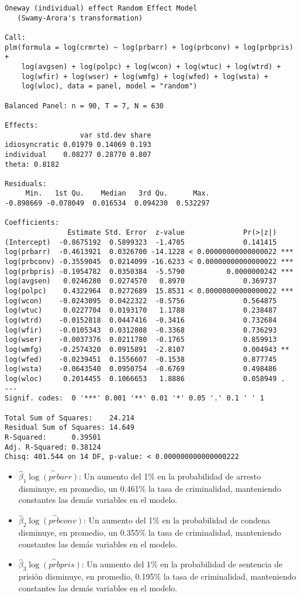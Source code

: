 \documentclass[
  12pt,
]{article}
\begin{document}
\begin{verbatim}
Oneway (individual) effect Random Effect Model 
   (Swamy-Arora's transformation)

Call:
plm(formula = log(crmrte) ~ log(prbarr) + log(prbconv) + log(prbpris) + 
    log(avgsen) + log(polpc) + log(wcon) + log(wtuc) + log(wtrd) + 
    log(wfir) + log(wser) + log(wmfg) + log(wfed) + log(wsta) + 
    log(wloc), data = panel, model = "random")

Balanced Panel: n = 90, T = 7, N = 630

Effects:
                  var std.dev share
idiosyncratic 0.01979 0.14069 0.193
individual    0.08277 0.28770 0.807
theta: 0.8182

Residuals:
     Min.   1st Qu.    Median   3rd Qu.      Max. 
-0.898669 -0.078049  0.016534  0.094230  0.532297 

Coefficients:
               Estimate Std. Error  z-value              Pr(>|z|)    
(Intercept)  -0.8675192  0.5899323  -1.4705              0.141415    
log(prbarr)  -0.4613921  0.0326700 -14.1228 < 0.00000000000000022 ***
log(prbconv) -0.3559045  0.0214099 -16.6233 < 0.00000000000000022 ***
log(prbpris) -0.1954782  0.0350384  -5.5790          0.0000000242 ***
log(avgsen)   0.0246280  0.0274570   0.8970              0.369737    
log(polpc)    0.4322964  0.0272689  15.8531 < 0.00000000000000022 ***
log(wcon)    -0.0243095  0.0422322  -0.5756              0.564875    
log(wtuc)     0.0227704  0.0193170   1.1788              0.238487    
log(wtrd)    -0.0152818  0.0447416  -0.3416              0.732684    
log(wfir)    -0.0105343  0.0312808  -0.3368              0.736293    
log(wser)    -0.0037376  0.0211780  -0.1765              0.859913    
log(wmfg)    -0.2574320  0.0915891  -2.8107              0.004943 ** 
log(wfed)    -0.0239451  0.1556607  -0.1538              0.877745    
log(wsta)    -0.0643540  0.0950754  -0.6769              0.498486    
log(wloc)     0.2014455  0.1066653   1.8886              0.058949 .  
---
Signif. codes:  0 '***' 0.001 '**' 0.01 '*' 0.05 '.' 0.1 ' ' 1

Total Sum of Squares:    24.214
Residual Sum of Squares: 14.649
R-Squared:      0.39501
Adj. R-Squared: 0.38124
Chisq: 401.544 on 14 DF, p-value: < 0.000000000000000222
\end{verbatim}

\begin{itemize}
\item
  \(\hat{\beta}_1\overset{\sim}{\log(prbarr)}\): Un aumento del 1\% en
  la probabilidad de arresto disminuye, en promedio, un 0.461\% la tasa
  de criminalidad, manteniendo constantes las demás variables en el
  modelo.
\item
  \(\hat{\beta}_2\overset{\sim}{\log(prbconv)}\): Un aumento del 1\% en
  la probabilidad de condena disminuye, en promedio, un 0.355\% la tasa
  de criminalidad, manteniendo constantes las demás variables en el
  modelo.
\item
  \(\hat{\beta}_3\overset{\sim}{\log(prbpris)}\): Un aumento del 1\% en
  la probabilidad de sentencia de prisión disminuye, en promedio,
  0.195\% la tasa de criminalidad, manteniendo constantes las demás
  variables en el modelo.
\end{itemize}
\end{document}
